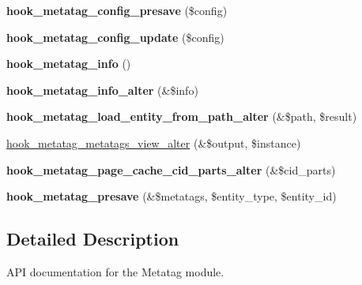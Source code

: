 \begin{DoxyCompactItemize}
\item 
\hypertarget{metatag_8api_8php_aa26379e2cc60773acc57186d9e79e7e0}{
{\bfseries hook\_\-metatag\_\-config\_\-presave} (\$config)}
\label{metatag_8api_8php_aa26379e2cc60773acc57186d9e79e7e0}

\item 
\hypertarget{metatag_8api_8php_aba7d46486cdbbbbfa0fd8f4e424945e6}{
{\bfseries hook\_\-metatag\_\-config\_\-update} (\$config)}
\label{metatag_8api_8php_aba7d46486cdbbbbfa0fd8f4e424945e6}

\item 
\hypertarget{metatag_8api_8php_a2521e652d81ad1a968055a6ea43869a5}{
{\bfseries hook\_\-metatag\_\-info} ()}
\label{metatag_8api_8php_a2521e652d81ad1a968055a6ea43869a5}

\item 
\hypertarget{metatag_8api_8php_ad2fb5103570d637b44cdc97aaa8865ef}{
{\bfseries hook\_\-metatag\_\-info\_\-alter} (\&\$info)}
\label{metatag_8api_8php_ad2fb5103570d637b44cdc97aaa8865ef}

\item 
\hypertarget{metatag_8api_8php_a7a9382c20f52c6d7040b03ed927c4617}{
{\bfseries hook\_\-metatag\_\-load\_\-entity\_\-from\_\-path\_\-alter} (\&\$path, \$result)}
\label{metatag_8api_8php_a7a9382c20f52c6d7040b03ed927c4617}

\item 
\hyperlink{metatag_8api_8php_a1a58a0a75630be58619b59923f79374c}{hook\_\-metatag\_\-metatags\_\-view\_\-alter} (\&\$output, \$instance)
\item 
\hypertarget{metatag_8api_8php_a406569b1a0e04f3a6640ddc0a060c968}{
{\bfseries hook\_\-metatag\_\-page\_\-cache\_\-cid\_\-parts\_\-alter} (\&\$cid\_\-parts)}
\label{metatag_8api_8php_a406569b1a0e04f3a6640ddc0a060c968}

\item 
\hypertarget{metatag_8api_8php_a623c99527233e1a3ff784485acfd6f14}{
{\bfseries hook\_\-metatag\_\-presave} (\&\$metatags, \$entity\_\-type, \$entity\_\-id)}
\label{metatag_8api_8php_a623c99527233e1a3ff784485acfd6f14}

\end{DoxyCompactItemize}


\subsection{Detailed Description}
API documentation for the Metatag module. 

